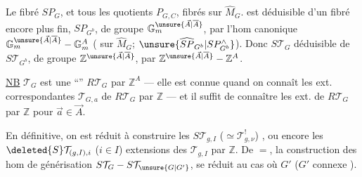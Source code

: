 Le fibré $SP_G$, et tous les quotients $P_{G,C}$,   fibrés sur $\widehat M_G$.  est déduisible d'un fibré encore plus fin, $SP_{G^b}$, de groupe $\mathbb{G}_m^{\unsure{\vec A|\overline A}}$, par l'hom canonique $\mathbb{G}_m^{\unsure{\vec A|\overline A}}-\mathbb{G}_m^A$ ( sur $\widehat M_G$;  $\unsure{\widehat{SP}_{G^b}|SP^{\wedge}_{G^b}}$). Donc $S\mathcal{T}_G$ déduisible de $S\mathcal{T}_{G^b}$, de groupe $\mathbb{Z}^{\unsure{\vec A|\overline A}}$, par $\mathbb{Z}^{\unsure{\vec A|\overline A}}-\mathbb{Z}^A$.

\uline{NB} $\mathcal{T}_G$ est une ``\uline{}''  $R\mathcal{T}_G$ par $\mathbb{Z}^A$ --- elle est connue quand on connaît les ext. correspondantes $\mathcal{T}_{G,a}$ de $R\mathcal{T}_G$  par $\mathbb{Z}$ --- et il suffit de connaître les ext.   de $R\mathcal{T}_G$ par $\mathbb{Z}$ pour $\vec a\in\vec A$.


En définitive, on est réduit à construire les $S\mathcal{T}_{g,I}$ ($\simeq\mathcal{T}_{g,\nu}^{!}$) , ou encore les $\deleted{S}\mathcal{T}_{(g,I),i}$ ($i\in I$) extensions des $\mathcal{T}_{g,I}$ par $\mathbb{Z}$. De $=$, la construction des hom de générisation $S\mathcal{T}_G-S\mathcal{T}_{\unsure{G|G'}}$, se réduit au cas où $G'$   ($G'$ connexe  ).

